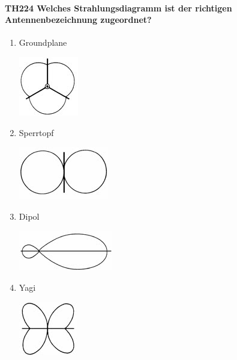 \documentclass[8pt]{article}
\begin{document}
\paragraph*{TH224 Welches Strahlungsdiagramm ist der richtigen Antennenbezeichnung zugeordnet?}
\begin{enumerate}[nolistsep,label=\Alph*]
\item Groundplane
\begin{center}
	\begin{minipage}{\linewidth}
		\centering
		\includegraphics[scale=1.0]{pics/th224_a.jpg}
	\end{minipage}
\end{center}
\item Sperrtopf
\begin{center}
	\begin{minipage}{\linewidth}
		\centering
		\includegraphics[scale=1.0]{pics/th224_b.jpg}
	\end{minipage}
\end{center}
\item Dipol
\begin{center}
	\begin{minipage}{\linewidth}
		\centering
		\includegraphics[scale=1.0]{pics/th224_c.jpg}
	\end{minipage}
\end{center}
\item Yagi
\begin{center}
	\begin{minipage}{\linewidth}
		\centering
		\includegraphics[scale=1.0]{pics/th224_d.jpg}
	\end{minipage}
\end{center}
\end{enumerate}
\end{document}
